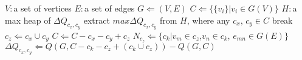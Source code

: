 \documentclass[a4paper,11pt]{article}
\begin{document}
\begin{algorithm}
	\begin{algorithmic}[1]
		\State $V\colon$a set of vertices
		\State $E\colon$a set of edges
		\State $G \Leftarrow (V,E)$
		\State $C\Leftarrow \{\{v_i\}|v_i \in  G(V)\}$
		\State $H\colon$a max heap of $\Delta Q_{c_x,c_y}$
		\State extract $max\Delta Q_{c_x,c_y}$ from $H$, where any $c_x$, $c_y \in C$
		\State break
		\EndIf
		\State $c_z \Leftarrow c_x \cup c_y$
		\State $C \Leftarrow C - c_x - c_y +c_z$
		\State $N_{c_{z}} \Leftarrow \{c_k | v_m \in c_z$,$ v_n \in c_k$, $e_{mn} \in G(E) \}$
		\State $\Delta Q_{c_x,c_y} \Leftarrow Q(G,C - c_k - c_z + (c_k \cup c_z)) -Q(G,C)$
		\EndFor
		\EndWhile
	\end{algorithmic}
\end{algorithm}
\end{document}
